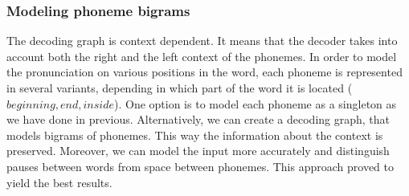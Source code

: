 \subsubsection{Modeling phoneme bigrams}
The decoding graph is context dependent. 
It means that the decoder takes into account both the right and the left context of the phonemes. 
In order to model the pronunciation on various positions in the word, each phoneme is represented in several variants, depending in which part of the word it is located ($beginning, end, inside$). 
One option is to model each phoneme as a singleton as we have done in previous.
Alternatively, we can create a decoding graph, that models bigrams of phonemes.
This way the information about the context is preserved.
Moreover, we can model the input more accurately and distinguish pauses between words from space between phonemes. 
This approach proved to yield the best results.
